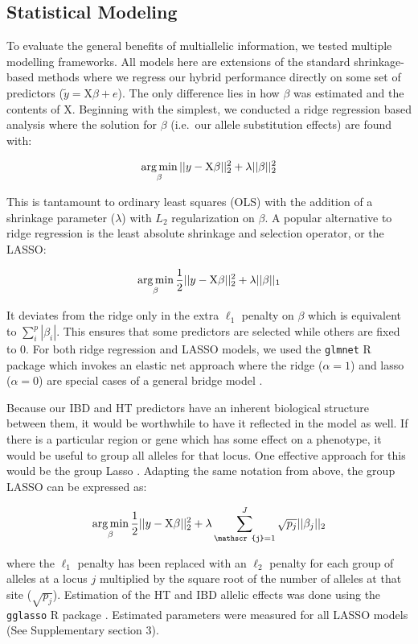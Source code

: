 \hypertarget{statistical-modeling}{%
\subsection{Statistical Modeling}\label{statistical-modeling}}

To evaluate the general benefits of multiallelic information, we tested
multiple modelling frameworks. All models here are extensions of
the standard shrinkage-based methods where we regress our hybrid
performance directly on some set of predictors
(\(\tilde{y} = \mathrm{X}\beta + e\)). The only difference lies in how
\(\beta\) was estimated and the contents of \(\mathrm{X}\). Beginning
with the simplest, we conducted a ridge regression based analysis where
the solution for \(\beta\) (i.e.~our allele substitution effects) are found
with:

\[\operatorname*{arg\,min}_{\beta} ||y - \mathrm{X}\beta||^2_2 + \lambda ||\beta||^2_2\]

This is tantamount to ordinary least squares (OLS) with the addition of
a shrinkage parameter (\(\lambda\)) with \(L_2\) regularization on
\(\beta\). A popular alternative to ridge regression is the least
absolute shrinkage and selection operator, or the LASSO:

\[\operatorname*{arg\,min}_{\beta} \frac{1}{2} ||y - \mathrm{X}\beta||^2_2 + \lambda  ||\beta||_1\]

It deviates from the ridge only in the extra \(\ell_1\) penalty on \(\beta\)
which is equivalent to \(\sum^p_i |\beta_i|\). This ensures that some predictors are selected while others are fixed to 0. For both ridge regression and LASSO models, we used the
\texttt{glmnet} R package which invokes an elastic net approach where
the ridge (\(\alpha = 1\)) and lasso (\(\alpha = 0\)) are special cases
of a general bridge model \autocite{Friedman2010}.

Because our IBD and HT predictors have an inherent biological structure
between them, it would be worthwhile to have it reflected in the model
as well. If there is a particular region or gene which has some
effect on a phenotype, it would be useful to group all alleles for that
locus. One effective approach for this would be the group Lasso
\autocite{Ogutu2014}. Adapting the same notation from above, the group
LASSO can be expressed as:

\[\argmin_{\beta} \frac{1}{2} ||y - \mathrm{X}\beta||^2_2 + \lambda \sum_{\mathscr{j} = 1}^J \sqrt{p_j}||\beta_j||_2\]

where the \(\ell_1\) penalty has been replaced with an \(\ell_2\)
penalty for each group of alleles at a locus \(j\) multiplied by the
square root of the number of alleles at that site (\(\sqrt{p_j}\)).
Estimation of the HT and IBD allelic effects
was done using the \texttt{gglasso} R package \autocite{Yang2015}. Estimated parameters were measured for all LASSO models (See Supplementary section 3).


